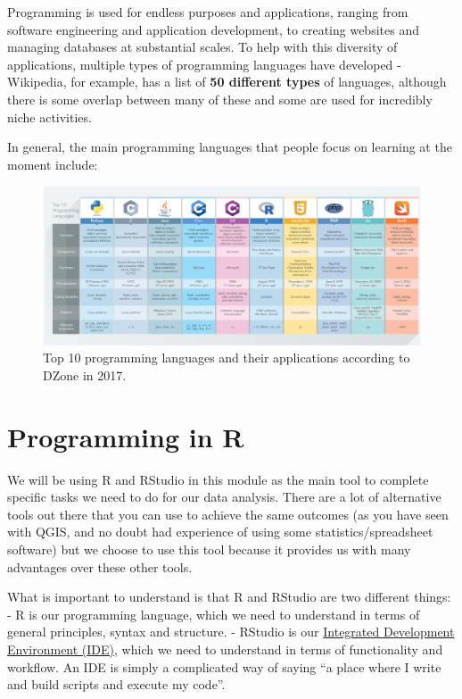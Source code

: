 \documentclass[
]{book}
\begin{document}
Programming is used for endless purposes and applications, ranging from software engineering and application development, to creating websites and managing databases at substantial scales. To help with this diversity of applications, multiple types of programming languages have developed - Wikipedia, for example, has a list of \textbf{50 different types} of languages, although there is some overlap between many of these and some are used for incredibly niche activities.

In general, the main programming languages that people focus on learning at the moment include:

\begin{figure}

{\centering \includegraphics[width=0.9\linewidth]{images/w04/programming_languages} 

}

\caption{Top 10 programming languages and their applications according to DZone in 2017.}\label{fig:04-programming-languages}
\end{figure}

\hypertarget{programming-in-r}{%
\section{Programming in R}\label{programming-in-r}}

We will be using R and RStudio in this module as the main tool to complete specific tasks we need to do for our data analysis. There are a lot of alternative tools out there that you can use to achieve the same outcomes (as you have seen with QGIS, and no doubt had experience of using some statistics/spreadsheet software) but we choose to use this tool because it provides us with many advantages over these other tools.

What is important to understand is that R and RStudio are two different things:
- R is our programming language, which we need to understand in terms of general principles, syntax and structure.
- RStudio is our \href{https://en.wikipedia.org/wiki/Integrated_development_environment}{Integrated Development Environment (IDE)}, which we need to understand in terms of functionality and workflow. An IDE is simply a complicated way of saying ``a place where I write and build scripts and execute my code''.
\end{document}

